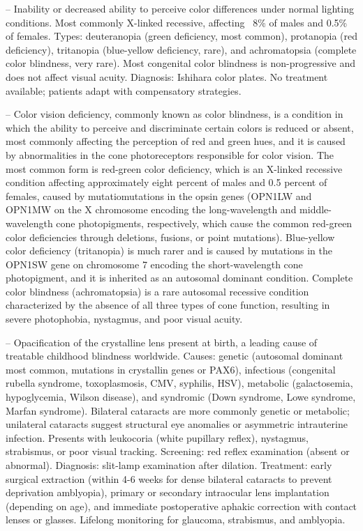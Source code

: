 -- Inability or decreased ability to perceive color differences under normal lighting conditions. Most commonly X-linked recessive, affecting ~8\% of males and 0.5\% of females. Types: deuteranopia (green deficiency, most common), protanopia (red deficiency), tritanopia (blue-yellow deficiency, rare), and achromatopsia (complete color blindness, very rare). Most congenital color blindness is non-progressive and does not affect visual acuity. Diagnosis: Ishihara color plates. No treatment available; patients adapt with compensatory strategies.

-- Color vision deficiency, commonly known as color blindness, is a condition in which the ability to perceive and discriminate certain colors is reduced or absent, most commonly affecting the perception of red and green hues, and it is caused by abnormalities in the cone photoreceptors responsible for color vision. The most common form is red-green color deficiency, which is an X-linked recessive condition affecting approximately eight percent of males and 0.5 percent of females, caused by mutatiomutations in the opsin genes (OPN1LW and OPN1MW on the X chromosome encoding the long-wavelength and middle-wavelength cone photopigments, respectively, which cause the common red-green color deficiencies through deletions, fusions, or point mutations). Blue-yellow color deficiency (tritanopia) is much rarer and is caused by mutations in the OPN1SW gene on chromosome 7 encoding the short-wavelength cone photopigment, and it is inherited as an autosomal dominant condition. Complete color blindness (achromatopsia) is a rare autosomal recessive condition characterized by the absence of all three types of cone function, resulting in severe photophobia, nystagmus, and poor visual acuity.

-- Opacification of the crystalline lens present at birth, a leading cause of treatable childhood blindness worldwide. Causes: genetic (autosomal dominant most common, mutations in crystallin genes or PAX6), infectious (congenital rubella syndrome, toxoplasmosis, CMV, syphilis, HSV), metabolic (galactosemia, hypoglycemia, Wilson disease), and syndromic (Down syndrome, Lowe syndrome, Marfan syndrome). Bilateral cataracts are more commonly genetic or metabolic; unilateral cataracts suggest structural eye anomalies or asymmetric intrauterine infection. Presents with leukocoria (white pupillary reflex), nystagmus, strabismus, or poor visual tracking. Screening: red reflex examination (absent or abnormal). Diagnosis: slit-lamp examination after dilation. Treatment: early surgical extraction (within 4-6 weeks for dense bilateral cataracts to prevent deprivation amblyopia), primary or secondary intraocular lens implantation (depending on age), and immediate postoperative aphakic correction with contact lenses or glasses. Lifelong monitoring for glaucoma, strabismus, and amblyopia.

